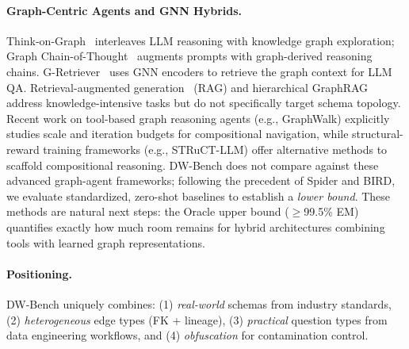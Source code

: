 \paragraph{Graph-Centric Agents and GNN Hybrids.}
Think-on-Graph~\cite{tog2024} interleaves LLM reasoning with knowledge graph exploration;
Graph Chain-of-Thought~\cite{gcot2024} augments prompts with graph-derived
reasoning chains.  G-Retriever~\cite{gretriever2024} uses GNN encoders to
retrieve the graph context for LLM QA.  Retrieval-augmented
generation~\cite{rag2020} (RAG) and hierarchical
GraphRAG~\cite{graphrag2024} address knowledge-intensive tasks but
do not specifically target schema topology. Recent work on tool-based graph
reasoning agents (e.g., GraphWalk) explicitly studies scale and iteration 
budgets for compositional navigation, while structural-reward training frameworks
(e.g., STRuCT-LLM) offer alternative methods to scaffold compositional reasoning.
DW-Bench does not compare against these advanced graph-agent frameworks;
following the precedent of Spider and BIRD, we evaluate standardized,
zero-shot baselines to establish a \emph{lower bound}.  These methods
are natural next steps: the Oracle upper bound ($\geq$99.5\% EM) quantifies
exactly how much room remains for hybrid architectures combining tools with
learned graph representations.

\paragraph{Positioning.}
DW-Bench uniquely combines: (1) \emph{real-world} schemas from industry
standards, (2) \emph{heterogeneous} edge types (FK + lineage), (3)
\emph{practical} question types from data engineering workflows, and (4)
\emph{obfuscation} for contamination control.
